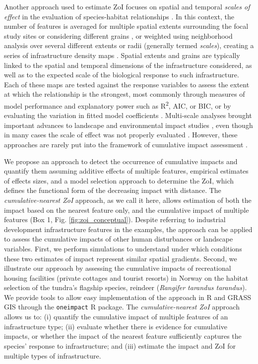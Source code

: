 \documentclass[titlepage]{article}
\begin{document}
Another approach used to estimate ZoI focuses on spatial and temporal \textit{scales of effect} in the evaluation of species-habitat relationships \citep[e.g.][]{zeller_multi-level_2017}. In this context, the number of features is averaged for multiple spatial extents surrounding the focal study sites \citep{jackson_are_2015} or considering different grains \citep{laforge_process-focussed_2015}, or weighted using neighborhood analysis over several different extents or radii (generally termed \textit{scales}), creating a series of infrastructure density maps \citep{mcgarigal_multi-scale_2016}. Spatial extents and grains are typically linked to the spatial and temporal dimensions of the infrastructure considered, as well as to the expected scale of the biological response to such infrastructure. Each of these maps are tested against the response variables to assess the extent at which the relationship is the strongest, most commonly through measures of model performance and explanatory power such as R\textsuperscript{2}, AIC, or BIC, or by evaluating the variation in fitted model coefficients \citep{huais_multifit_2018,jackson_are_2015}.
Multi-scale analyses brought important advances to landscape and environmental impact studies \citep[e.g.][]{mcgarigal_multi-scale_2016}, even though in many cases the scale of effect was not properly evaluated \citep{jackson_are_2015}. However, these approaches are rarely put into the framework of cumulative impact assessment \citep[but see][]{polfus_identifying_2011}.

We propose an approach to detect the occurrence of cumulative impacts and quantify them assuming additive effects of multiple features, empirical estimates of effects sizes, and a model selection approach to determine the ZoI, which defines the functional form of the decreasing impact with distance. The \textit{cumulative-nearest ZoI} approach, as we call it here, allows estimation of both the impact based on the nearest feature only, and the cumulative impact of multiple features (Box 1, Fig. \ref{fig:zoi_conceptual}). Despite referring to industrial development infrastructure features in the examples, the approach can be applied to assess the cumulative impacts of other human disturbances or landscape variables. First, we perform simulations to understand under which conditions these two estimates of impact represent similar spatial gradients.
Second, we illustrate our approach by assessing the cumulative impacts of recreational housing facilities (private cottages and tourist resorts) in Norway on the habitat selection of the tundra's flagship species, reindeer (\textit{Rangifer tarandus tarandus}). We provide tools to allow easy implementation of the approach in R \citep{r_core_team_r_2020} and GRASS GIS \citep{grass_development_team_geographic_2017} through the \verb|oneimpact| R package. The \textit{cumulative-nearest ZoI} approach allows us to: (i) quantify the cumulative impact of multiple features of an infrastructure type; (ii) evaluate whether there is evidence for cumulative impacts, or whether the impact of the nearest feature sufficiently captures the species' response to infrastructure; and (iii) estimate the impact and ZoI for multiple types of infrastructure. 
\end{document}
